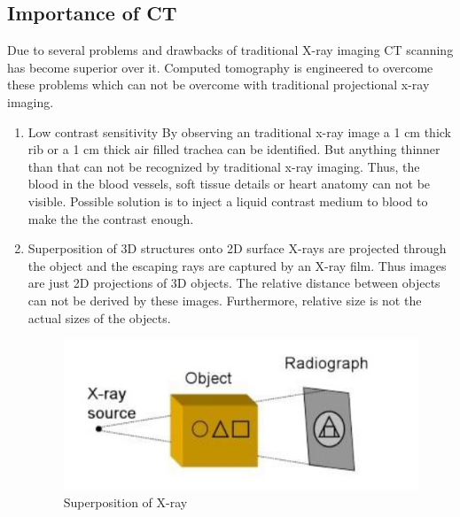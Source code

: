 \documentclass[12pt]{article}
\begin{document}
\subsection{Importance of CT}
Due to several problems and drawbacks of traditional X-ray imaging CT scanning has become superior over it. Computed tomography is engineered to overcome these problems which can not be overcome with traditional projectional x-ray imaging. 
\begin{enumerate}
    \item Low contrast sensitivity\newline
    By observing an traditional x-ray image a 1 cm thick rib or a 1 cm thick air filled trachea can be identified. But anything thinner than that can not be recognized by traditional x-ray imaging. Thus, the blood in the blood vessels, soft tissue details or heart anatomy can not be visible. Possible solution is to inject a liquid contrast medium to blood to make the the contrast enough. \newline

    \item Superposition of 3D structures onto 2D surface
    X-rays are projected through the object and the escaping rays are captured by an X-ray film. Thus images are just 2D projections of 3D objects. The relative distance between objects can not be derived by these images. Furthermore, relative size is not the actual sizes of the objects. 
    \begin{figure}[h!]
        \centering
        \includegraphics[width=0.65\linewidth]{X1.jpg}
        \caption{\small{Superposition of X-ray}}
        \label{fig:Superposition of X-ray.}
    \end{figure}



\end{enumerate}
\end{document}
